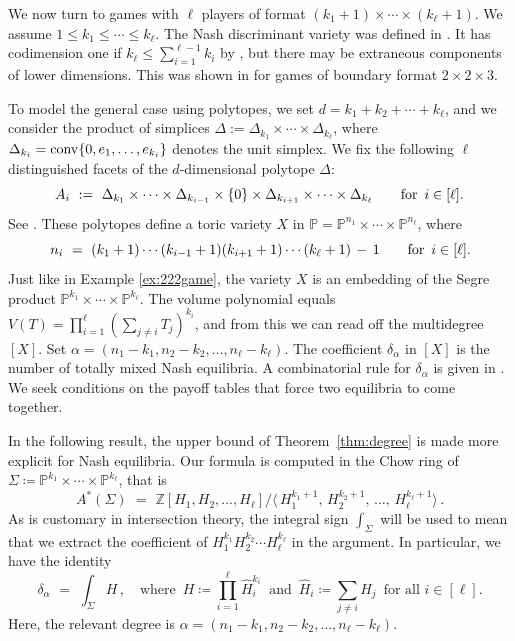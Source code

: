 \documentclass[12pt]{article}
\theoremstyle{definition}
\newcommand{\bZ}{\mathbb Z}
\newcommand{\bP}{\mathbb P}
\begin{document}
We now turn to games with $\ell$ players of format
$(k_1+1)\times\cdots\times(k_\ell+1)$. We assume $1\le k_1\le\cdots\le k_\ell$. 
The Nash discriminant variety was defined in \cite[Section 3]{vectorBundleNash}.
It has codimension one if $k_\ell\le\sum_{i=1}^{\ell-1}k_i$ by \cite[Theorem 3.7]{vectorBundleNash}, but there may be
extraneous components of lower dimensions.
This was shown in \cite[Example 3.27]{vectorBundleNash} for 
games of boundary format $2 \times 2 \times 3 $.

To model the general case using polytopes, we set $d = k_1 + k_2 + \cdots + k_\ell$,
and we consider the product of simplices $\Delta := \Delta_{k_1} \times \cdots \times \Delta_{k_\ell} $,
where $\Delta_{k_i} = {\rm conv}\{0,e_1,\ldots,e_{k_i} \}$ denotes the unit simplex.
We fix the following $\ell$ distinguished facets of the $d$-dimensional polytope $\Delta$:
$$ A_i \,\, := \,\, \Delta_{k_1} \times  \cdots \times \Delta_{k_{i-1}} \times \{0\} \times
\Delta_{k_{i+1}} \times \cdots \times \Delta_{k_\ell} \qquad {\rm for} \,\,\, i \in [\ell]. $$
See \cite[Section 6.4]{CBMS}. These  polytopes define a toric variety  $X $
in $\bP = \bP^{n_1} \times  \cdots \times \bP^{n_\ell}$, where
$$\, n_i \,\,= \,\,(k_1+1)\cdots (k_{i-1}+1)(k_{i+1}+1) \cdots (k_\ell+1)\,-\,1 
\qquad {\rm for} \,\,\, i \in [\ell]. $$
Just like in Example \ref{ex:222game}, the variety $X$ is an embedding of the
Segre product $\bP^{k_1} \times \cdots \times \bP^{k_\ell}$.
The volume polynomial equals
$V(T) =  \prod_{i=1}^\ell ( \sum_{j \not= i} T_j)^{k_i}$,
and from this we can read off the multidegree $[X]$.
Set $\alpha = (n_1-k_1,n_2-k_2,\ldots,n_\ell-k_\ell)$.
The coefficient $\delta_\alpha$ in $[X]$ is the 
number of totally mixed Nash equilibria.
A combinatorial rule for $\delta_\alpha$ is given in \cite[Theorem 6.8]{CBMS}.
We seek conditions on the payoff tables
that force two equilibria to come together.

\smallskip

In the following result, the upper bound of Theorem~\ref{thm:degree} 
is made more explicit for 
Nash equilibria.
Our formula is computed in the Chow ring of $\Sigma\coloneqq\bP^{k_1} \times \cdots \times \bP^{k_\ell}$, that is
\[
    A^*(\Sigma) \,\,=\,\, \bZ[H_1,H_2,\ldots,H_\ell] / \bigl\langle \,
    H_1^{k_1+1},  \,H_2^{k_2+1},\,\ldots, \,H_\ell^{k_\ell+1} \bigr\rangle\,.
\]
As is customary in intersection theory, 
the integral sign $\int_\Sigma$ will be used to mean that we extract the coefficient of $H_1^{k_1} H_2^{k_2} \cdots H_\ell^{k_\ell}$
  in the argument. In particular, we have the identity
\begin{equation}\label{eq:delta}
	\delta_\alpha \,\,= \,\,\int_\Sigma H\,,\quad
	\text{where}\,\,\, H\coloneqq \prod_{i=1}^\ell\hat{H}_i^{k_i}\ \,\,
	\text{and}\,\,\, \hat{H}_i\coloneqq\sum_{j\neq i}H_j\,\,\,\text{for all $i\in[\ell]$.}
\end{equation}
Here, the relevant degree is  $\alpha = (n_1-k_1,n_2-k_2,\ldots,n_\ell-k_\ell)$.
\end{document}
